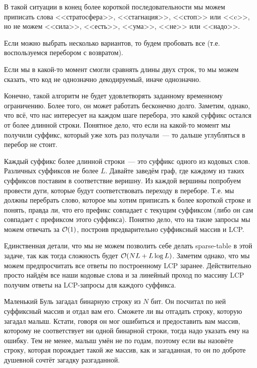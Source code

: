 \documentclass[addpoints]{exam}
\begin{document}
\begin{questions}
\begin{solution}
В такой ситуации в конец более короткой последовательности мы можем приписать слова <<стратосфера>>, <<стагнация>>, <<стоп>> или <<c>>, но не можем <<сила>>, <<есть>>, <<ума>>, <<не>> или <<надо>>.

Если можно выбрать несколько вариантов, то будем пробовать все (т.е. воспользуемся перебором с возвратом).

Если мы в какой-то момент смогли сравнять длины двух строк, то мы можем сказать, что код не однозначно декодируемый, иначе однозначно.

Конечно, такой алгоритм не будет удовлетворять заданному временному ограничению. Более того, он может работать бесконечно долго. Заметим, однако, что всё, что нас интересует на каждом шаге перебора, это какой суффикс остался от более длинной строки. Понятное дело, что если на какой-то момент мы получили суффикс, который уже хоть раз получали~--- то дальше углубляться в перебор не стоит.

Каждый суффикс более длинной строки~--- это суффикс одного из кодовых слов. Различных суффиксов не более $L$. Давайте заведём граф, где каждому из таких суффиксов поставим в соответствие веришну. Из каждой вершины попробуем провести дуги, которые будут соответствовать переходу в переборе. Т.е. мы должны перебрать слово, которое мы хотим приписать к более короткой строке и понять, правда ли, что его префикс совпадает с текущим суффиксом (либо он сам совпадает с префиксом этого суффикса). Понятно дело, что на такие запросы мы можем отвечать за $\mathcal{O}(1)$, построив предварительно суффиксный массив и LCP.

Единственная детали, что мы не можем позволить себе делать sparse-table в этой задаче, так как тогда сложность будет $\mathcal{O}(NL + L \log L)$. Заметим однако, что мы можем предпросчитать все ответы по построенному LCP заранее. Действительно просто найдём все наши кодовые слова и за линейный проход по массиву LCP получим ответы на  LCP-запросы для каждого суффикса.

\end{solution}

\question[1] Маленький Буль загадал бинарную строку из $N$ бит. Он посчитал по ней суффиксный массив и отдал вам его. Сможете ли вы отгадать строку, которую загадал малыш. Кстати, говоря он мог ошибиться и предоставить вам массив, которому не соответствует ни одной бинарной строки, тогда надо указать ему на ошибку. Тем не менее, малыш умён не по годам, поэтому если вы назовёте строку, которая порождает такой же массив, как и загаданная, то он по доброте душевной сочтёт загадку разгаданной.


\end{questions}
\end{document}
